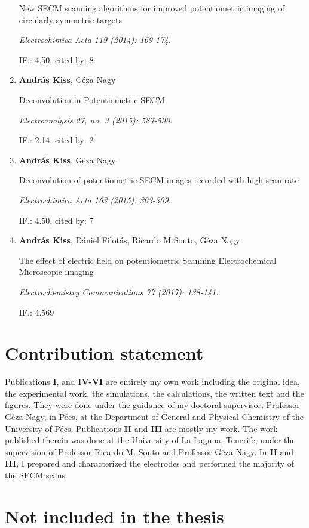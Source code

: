 \begin{enumerate}
New SECM scanning algorithms for improved potentiometric imaging of circularly symmetric targets 

\emph{Electrochimica Acta 119 (2014): 169-174.}

IF.: 4.50, cited by: 8

\item \textbf{András Kiss}, Géza Nagy

Deconvolution in Potentiometric SECM

\emph{Electroanalysis 27, no. 3 (2015): 587-590.}

IF.: 2.14, cited by: 2

\item \textbf{András Kiss}, Géza Nagy

Deconvolution of potentiometric SECM images recorded with high scan rate

\emph{Electrochimica Acta 163 (2015): 303-309.}

IF.: 4.50, cited by: 7

\item \textbf{András Kiss}, Dániel Filotás, Ricardo M Souto, Géza Nagy

The effect of electric field on potentiometric Scanning Electrochemical Microscopic imaging

\emph{Electrochemistry Communications 77 (2017): 138-141.}

IF.: 4.569

\end{enumerate}
\section*{Contribution statement}
Publications \textbf{I}, and \textbf{IV-VI} are entirely my own work including the original idea, the experimental work, the simulations, the calculations, the written text and the figures. They were done under the guidance of my doctoral supervisor, Professor Géza Nagy, in Pécs, at the Department of General and Physical Chemistry of the University of Pécs.
Publications \textbf{II} and \textbf{III} are mostly my work.
The work published therein was done at the University of La Laguna, Tenerife, under the supervision of Professor Ricardo M. Souto and Professor Géza Nagy.
In \textbf{II} and \textbf{III}, I prepared and characterized the electrodes and performed the majority of the SECM scans. 

\newpage
\section*{Not included in the thesis}

